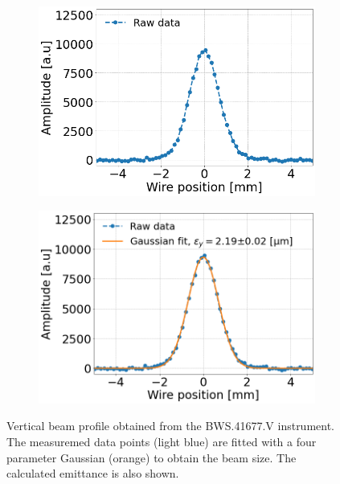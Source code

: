 \begin{figure}[!h]
   \centering
   \begin{subfigure}{.5\textwidth}
     \centering
     \includegraphics[width=1.0\linewidth]{images/Ch4/SPS.BWS.41677.V_ROT_2018-09-05 15_45_01.33500_raw.png}
   \end{subfigure}%
   \begin{subfigure}{.5\textwidth}
     \centering
     \includegraphics[width=1.0\linewidth]{images/Ch4/SPS.BWS.41677.V_ROT_2018-09-05 15_45_01.33500_raw_and_fit.png}
   \end{subfigure}
   \caption{ Vertical beam profile obtained from the BWS.41677.V instrument. The measuremed data points (light blue) are fitted with a four parameter Gaussian (orange) to obtain the beam size. The calculated emittance is also shown.}
   \label{fig:WS_example_V_profile}
\end{figure}

